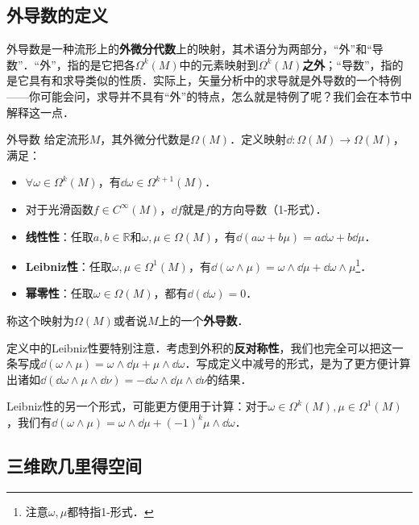 

\subsection{外导数的定义}

外导数是一种流形上的\textbf{外微分代数}上的映射，其术语分为两部分，“外”和“导数”．“外”，指的是它把各$\Omega^k(M)$中的元素映射到$\Omega^k(M)$\textbf{之外}；“导数”，指的是它具有和求导类似的性质．实际上，矢量分析中的求导就是外导数的一个特例——你可能会问，求导并不具有“外”的特点，怎么就是特例了呢？我们会在本节中解释这一点．

\begin{definition}{外导数}
给定流形$M$，其外微分代数是$\Omega (M)$．定义映射$\dd:\Omega (M)\rightarrow\Omega (M)$，满足：
\begin{itemize}
\item $\forall \omega\in\Omega^k(M)$，有$\dd \omega\in\Omega^{k+1}(M)$．
\item 对于光滑函数$f\in C^\infty(M)$，$\dd f$就是$f$的方向导数（1-形式）．
\item \textbf{线性性}：任取$a, b\in \mathbb{R}$和$\omega, \mu\in\Omega(M)$，有$\dd(a\omega+b\mu)=a\dd\omega+b\dd\mu$．
\item \textbf{Leibniz性}：任取$\omega, \mu\in\Omega^1(M)$，有$\dd(\omega\wedge\mu)=\omega\wedge\dd\mu+\dd\omega\wedge\mu$\footnote{注意$\omega, \mu$都特指1-形式．}．
\item \textbf{幂零性}：任取$\omega\in\Omega(M)$，都有$\dd(\dd\omega)=0$．
\end{itemize}
称这个映射为$\Omega (M)$或者说$M$上的一个\textbf{外导数}．
\end{definition}

定义中的Leibniz性要特别注意．考虑到外积的\textbf{反对称性}，我们也完全可以把这一条写成$\dd(\omega\wedge\mu)=\omega\wedge\dd\mu+\mu\wedge\dd\omega$．写成定义中减号的形式，是为了更方便计算出诸如$\dd(\dd\omega\wedge\mu\wedge\dd\nu)=-\dd\omega\wedge\dd\mu\wedge\dd\nu$的结果．

Leibniz性的另一个形式，可能更方便用于计算：对于$\omega\in\Omega^k(M), \mu\in\Omega^1(M)$，我们有$\dd(\omega\wedge\mu)=\omega\wedge\dd\mu+(-1)^k\mu\wedge\dd\omega$．

\subsection{三维欧几里得空间}

